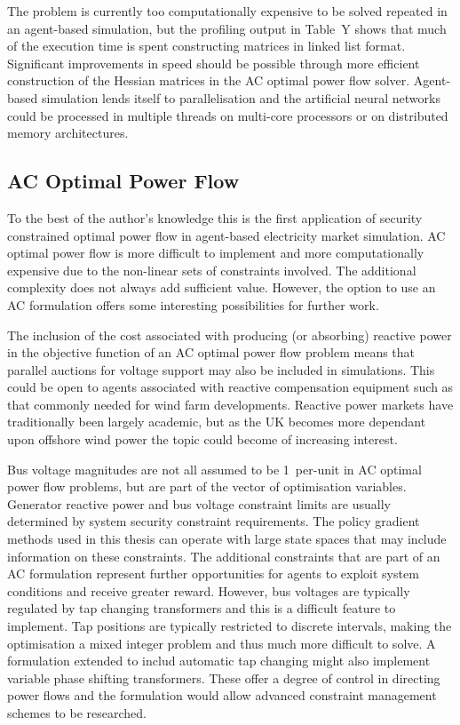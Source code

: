 The problem is currently too computationally expensive to be
solved repeated in an agent-based simulation, but the profiling output in
Table~Y shows that much of the execution time is spent constructing matrices in
linked list format.  Significant improvements in speed should be possible
through more efficient construction of the Hessian matrices in the AC optimal
power flow solver.  Agent-based simulation lends itself to parallelisation and
the artificial neural networks could be processed in multiple threads on
multi-core processors or on distributed memory architectures.

\subsection{AC Optimal Power Flow}
To the best of the author's knowledge this is the first application of security
constrained optimal power flow in agent-based electricity market simulation.
AC optimal power flow is more difficult to implement and more computationally
expensive due to the non-linear sets of constraints involved.  The
additional complexity does not always add sufficient value. However, the
option to use an AC formulation offers some interesting possibilities for
further work.

The inclusion of the cost associated with producing (or absorbing) reactive
power in the objective function of an AC optimal power flow problem means that
parallel auctions for voltage support may also be included in simulations.
This could be open to agents associated with reactive compensation equipment such as that commonly
needed for wind farm developments.  Reactive power markets have traditionally
been largely academic, but as the UK becomes more dependant upon
offshore wind power the topic could become of increasing interest.

Bus voltage magnitudes are not all assumed to be 1~per-unit in AC optimal power
flow problems, but are part of the vector of optimisation variables.  Generator
reactive power and bus voltage constraint limits are usually determined by system
security constraint requirements.  The policy gradient methods used in this
thesis can operate with large state spaces that may include information on
these constraints.  The additional constraints that are part of an AC
formulation represent further opportunities for agents to exploit system
conditions and receive greater reward.  However, bus voltages are typically
regulated by tap changing transformers and this is a difficult feature to
implement.  Tap positions are typically restricted to discrete intervals,
making the optimisation a mixed integer problem and thus much more difficult
to solve.  A formulation extended to includ automatic tap changing might also
implement variable phase shifting transformers.  These offer a degree of
control in directing power flows and the formulation would allow advanced
constraint management schemes to be researched.

